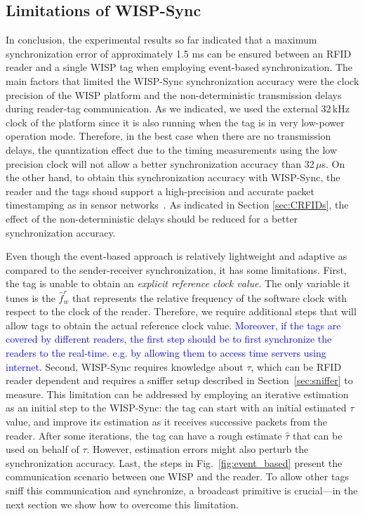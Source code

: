 \documentclass[10pt,journal,compsoc]{IEEEtran}
\newcommand{\add}[1]{\textcolor{blue}{#1}}
\begin{document}
\subsection{Limitations of WISP-Sync}

In conclusion, the experimental results so far indicated that a maximum synchronization error of approximately 1.5 ms can be ensured between an RFID reader and a single WISP tag when employing event-based synchronization. The main factors that limited the WISP-Sync synchronization accuracy were the clock precision of the WISP platform and the non-deterministic transmission delays during reader-tag communication. As we indicated, we used the external 32\,kHz clock of the platform since it is also running when the tag is in very low-power operation mode. Therefore, in the best case when there are no transmission delays, the quantization effect due to the timing measurements using the low precision clock will not allow a better synchronization accuracy than 32\,$\mu$s. On the other hand, to obtain this synchronization accuracy with WISP-Sync, the reader and the tags shoud support a high-precision and accurate packet timestamping as in sensor networks~\cite{Maroti2004}. As indicated in Section \ref{sec:CRFIDs}, the effect of the non-deterministic delays should be reduced for a better synchronization accuracy.

Even though the event-based approach is relatively lightweight and adaptive as compared to the sender-receiver synchronization, it has some limitations. First, the tag is unable to obtain an \emph{explicit reference clock value}. The only variable it tunes is the $\hat{f}_w^r$ that represents the relative frequency of the software clock with respect to the clock of the reader. Therefore, we require additional steps that will allow tags to obtain the actual reference clock value. \add{Moreover, if the tags are covered by different readers, the first step should be to first synchronize the readers to the real-time. e.g. by allowing them to access time servers using internet.}
Second, WISP-Sync requires knowledge about $\tau$, which can be RFID reader dependent and requires a sniffer setup described in Section~\ref{sec:sniffer} to measure. This limitation can be addressed by employing an iterative estimation as an initial step to the WISP-Sync: the tag can start with an initial estimated $\tau$ value, and improve its estimation as it receives successive packets from the reader. After some iterations, the tag can have a rough estimate $\hat{\tau}$ that can be used on behalf of $\tau$. However, estimation errors might also perturb the synchronization accuracy. Last, the steps in Fig.~\ref{fig:event_based} present the communication scenario between one WISP and the reader. To allow other tags sniff this communication and synchronize, a broadcast primitive is crucial---in the next section we show how to overcome this limitation.
\end{document}
